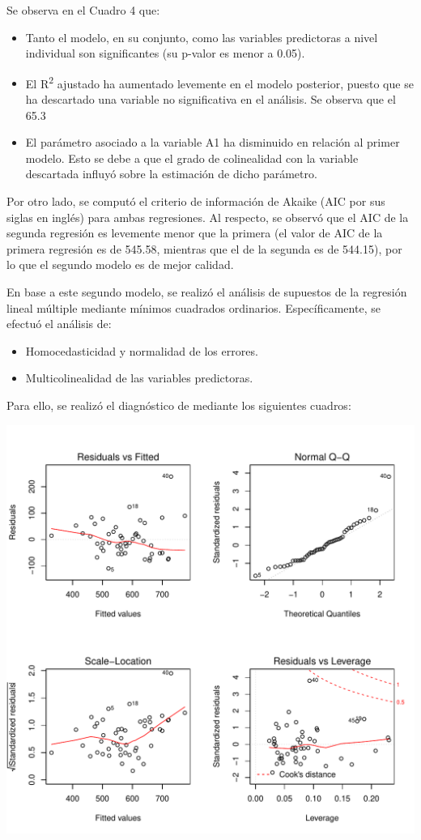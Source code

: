 \documentclass[a4paper,10pt]{article}\usepackage[]{graphicx}\usepackage[]{color}
\makeatletter
\def\maxwidth{ %
  \ifdim\Gin@nat@width>\linewidth
    \linewidth
  \else
    \Gin@nat@width
  \fi
}
\makeatother
\begin{document}
Se observa en el Cuadro 4 que:
\begin{itemize}
  \item Tanto el modelo, en su conjunto, como las variables predictoras a nivel individual son significantes (su p-valor es menor a 0.05).
  \item El R\textsuperscript{2} ajustado ha aumentado levemente en el modelo posterior, puesto que se ha descartado una variable no significativa en el análisis. Se observa que el 65.3%
  \item El parámetro asociado a la variable A1 ha disminuido en relación al primer modelo. Esto se debe a que el grado de colinealidad con la variable descartada influyó sobre la estimación de dicho parámetro.

\end{itemize}

  Por otro lado, se computó el criterio de información de Akaike (AIC por sus siglas en inglés) para ambas regresiones. Al respecto, se observó que el AIC de la segunda regresión es levemente menor que la primera (el valor de AIC de la primera regresión es de 545.58, mientras que el de la segunda es de 544.15), por lo que el segundo modelo es de mejor calidad.
  
En base a este segundo modelo, se realizó el análisis de supuestos de la regresión lineal múltiple mediante mínimos cuadrados ordinarios. Específicamente, se efectuó el análisis de:

\begin{itemize}
  \item Homocedasticidad y normalidad de los errores.
  \item Multicolinealidad de las variables predictoras.
\end{itemize}

Para ello, se realizó el diagnóstico de mediante los siguientes cuadros:


\includegraphics[width=\maxwidth]{figure/unnamed-chunk-6-1} 
\end{document}

